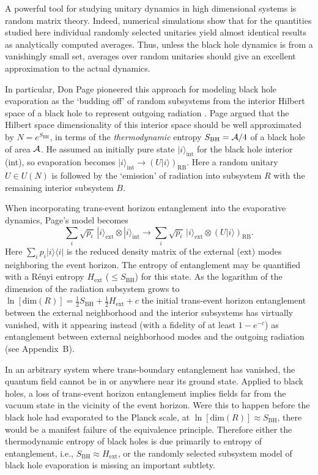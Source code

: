 \documentclass[twocolumn,aps,prl]{revtex4}
\begin{document}
A powerful tool for studying unitary dynamics in high dimensional systems
is random matrix theory. Indeed, numerical simulations show that for the
quantities studied here individual randomly selected unitaries yield
almost identical results as analytically computed averages. Thus,
unless the black hole dynamics is from a vanishingly small
set, averages over random unitaries should give an excellent
approximation to the actual dynamics.

In particular, Don Page \cite{Page93} pioneered this approach for modeling
black hole evaporation as the `budding off' of random subsystems from
the interior Hilbert space of a black hole to represent outgoing
radiation \cite{Page93,Hayden07,B09}. Page argued that the Hilbert
space dimensionality of this interior space should be well approximated
by $N=e^{S_{\text{BH}}}$, in terms of the {\it thermodynamic\/} entropy
$S_{\text{BH}}={\cal A}/4$ of a black hole of area ${\cal A}$. He
assumed an initially pure state $|i\rangle_{\text{int}}$ for the black
hole interior (int), so evaporation becomes 
$|i\rangle_{\text{int}}\rightarrow (U|i\rangle)_{\text{RB}}$. Here a
random unitary $U\in U(N)$ is followed by the `emission' of radiation
into subsystem $R$ with the remaining interior subsystem $B$.

When incorporating trans-event horizon entanglement into the
evaporative dynamics, Page's model becomes
$$
\sum_{i}\sqrt{p_i}\, |i\rangle_{\text{ext}}\otimes|i\rangle_{\text{int}}
\rightarrow
\sum_{i} \sqrt{p_i}\,
|i\rangle_{\text{ext}}\otimes(U|i\rangle)_{\text{RB}}.
$$
Here $\sum_i p_i |i\rangle%
\langle i|$
is the reduced density matrix of the external (ext) modes neighboring
the event horizon.  The entropy of entanglement may be quantified with
a R\'enyi entropy $H_{\text{ext}}$ ($\le S_{\text{BH}}$) for this state.
As the logarithm of the dimension of the radiation subsystem grows to
$\ln[{\text{dim}}(R)]=\frac{1}{2}S_{\text{BH}}+\frac{1}{2}H_{\text{ext}}+c$
the initial trans-event horizon entanglement between the external
neighborhood and the interior subsystems has virtually vanished, with
it appearing instead (with a fidelity of at least $1-e^{-c}$) as
entanglement between external neighborhood modes and the outgoing
radiation (see Appendix~B).

In an arbitrary system where trans-boundary entanglement has vanished,
the quantum field cannot be in or anywhere near its ground state.
Applied to black holes, a loss of trans-event horizon entanglement
implies fields far from the vacuum state in the vicinity of the event
horizon. Were this to happen before the black hole had evaporated to
the Planck scale, at $\ln[{\text{dim}}(R)]\approx S_{\text{BH}}$, there
would be a manifest failure of the equivalence principle. Therefore
either the thermodynamic entropy of black holes is due primarily to
entropy of entanglement, i.e., $S_{\text{BH}}\approx H_{\text{ext}}$,
or the randomly selected subsystem model of black hole evaporation is
missing an important subtlety.
\end{document}
